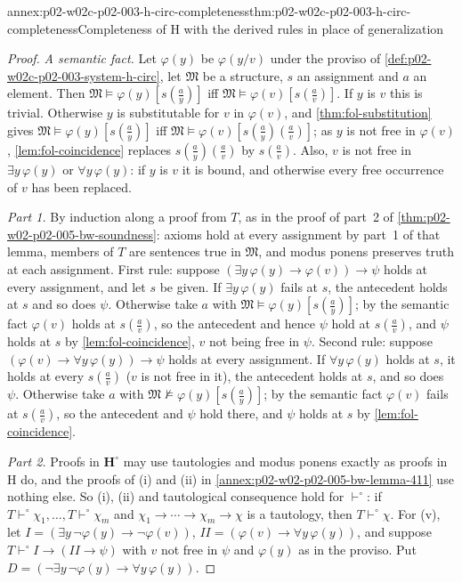 \begin{annexitem}{annex:p02-w02c-p02-003-h-circ-completeness}{thm:p02-w02c-p02-003-h-circ-completeness}{Completeness of H with the derived rules in place of generalization}
\begin{proof}
\emph{A semantic fact.}  Let \(\varphi(y)\) be \(\varphi(y/v)\) under the
proviso of \cref{def:p02-w02c-p02-003-system-h-circ}, let \(\mathfrak M\)
be a structure, \(s\) an assignment and \(a\) an element.  Then
\(\mathfrak M\models\varphi(y)[s(\tfrac ay)]\) iff
\(\mathfrak M\models\varphi(v)[s(\tfrac av)]\).  If \(y\) is \(v\) this is
trivial.  Otherwise \(y\) is substitutable for \(v\) in \(\varphi(v)\), and
\cref{thm:fol-substitution} gives
\(\mathfrak M\models\varphi(y)[s(\tfrac ay)]\) iff
\(\mathfrak M\models\varphi(v)[s(\tfrac ay)(\tfrac av)]\); as \(y\) is not
free in \(\varphi(v)\), \cref{lem:fol-coincidence} replaces
\(s(\tfrac ay)(\tfrac av)\) by \(s(\tfrac av)\).  Also, \(v\) is not free
in \(\exists y\,\varphi(y)\) or \(\forall y\,\varphi(y)\): if \(y\) is
\(v\) it is bound, and otherwise every free occurrence of \(v\) has been
replaced.

\emph{Part 1.}  By induction along a proof from \(T\), as in the proof of
part~2 of \cref{thm:p02-w02-p02-005-bw-soundness}: axioms hold at every
assignment by part~1 of that lemma, members of \(T\) are sentences true in
\(\mathfrak M\), and modus ponens preserves truth at each assignment.  First
rule: suppose \((\exists y\,\varphi(y)\to\varphi(v))\to\psi\) holds at every
assignment, and let \(s\) be given.  If \(\exists y\,\varphi(y)\) fails at
\(s\), the antecedent holds at \(s\) and so does \(\psi\).  Otherwise take
\(a\) with \(\mathfrak M\models\varphi(y)[s(\tfrac ay)]\); by the semantic
fact \(\varphi(v)\) holds at \(s(\tfrac av)\), so the antecedent and hence
\(\psi\) hold at \(s(\tfrac av)\), and \(\psi\) holds at \(s\) by
\cref{lem:fol-coincidence}, \(v\) not being free in \(\psi\).  Second rule:
suppose \((\varphi(v)\to\forall y\,\varphi(y))\to\psi\) holds at every
assignment.  If \(\forall y\,\varphi(y)\) holds at \(s\), it holds at every
\(s(\tfrac av)\) (\(v\) is not free in it), the antecedent holds at \(s\),
and so does \(\psi\).  Otherwise take \(a\) with
\(\mathfrak M\not\models\varphi(y)[s(\tfrac ay)]\); by the semantic fact
\(\varphi(v)\) fails at \(s(\tfrac av)\), so the antecedent and \(\psi\) hold
there, and \(\psi\) holds at \(s\) by \cref{lem:fol-coincidence}.

\emph{Part 2.}  Proofs in \(\mathbf H^{\circ}\) may use tautologies and
modus ponens exactly as proofs in H do, and the proofs of (i) and (ii) in
\cref{annex:p02-w02-p02-005-bw-lemma-411} use nothing else.  So (i), (ii)
and tautological consequence hold for \(\vdash^{\circ}\): if \(T\vdash^{\circ}\chi_1,\ldots,T\vdash^{\circ}\chi_m\) and
\(\chi_1\to\cdots\to\chi_m\to\chi\) is a tautology, then
\(T\vdash^{\circ}\chi\).  For (v), let
\(I=(\exists y\,\neg\varphi(y)\to\neg\varphi(v))\),
\(I\!I=(\varphi(v)\to\forall y\,\varphi(y))\), and suppose
\(T\vdash^{\circ}I\to(I\!I\to\psi)\) with \(v\) not free in \(\psi\) and
\(\varphi(y)\) as in the proviso.  Put
\(D=(\neg\exists y\,\neg\varphi(y)\to\forall y\,\varphi(y))\).


\end{proof}
\end{annexitem}
